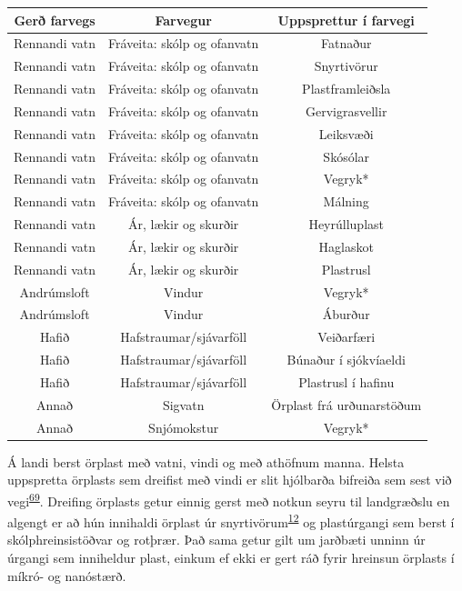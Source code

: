 \documentclass[icelandic,]{book}
\begin{document}
\begin{tabular}{ccc}
\toprule
Gerð farvegs & Farvegur & Uppsprettur í farvegi\\
\midrule
Rennandi vatn & Fráveita: skólp og ofanvatn & Fatnaður\\
Rennandi vatn & Fráveita: skólp og ofanvatn & Snyrtivörur\\
Rennandi vatn & Fráveita: skólp og ofanvatn & Plastframleiðsla\\
Rennandi vatn & Fráveita: skólp og ofanvatn & Gervigrasvellir\\
Rennandi vatn & Fráveita: skólp og ofanvatn & Leiksvæði\\
\addlinespace
Rennandi vatn & Fráveita: skólp og ofanvatn & Skósólar\\
Rennandi vatn & Fráveita: skólp og ofanvatn & Vegryk*\\
Rennandi vatn & Fráveita: skólp og ofanvatn & Málning\\
Rennandi vatn & Ár, lækir og skurðir & Heyrúlluplast\\
Rennandi vatn & Ár, lækir og skurðir & Haglaskot\\
\addlinespace
Rennandi vatn & Ár, lækir og skurðir & Plastrusl\\
Andrúmsloft & Vindur & Vegryk*\\
Andrúmsloft & Vindur & Áburður\\
Hafið & Hafstraumar/sjávarföll & Veiðarfæri\\
Hafið & Hafstraumar/sjávarföll & Búnaður í sjókvíaeldi\\
\addlinespace
Hafið & Hafstraumar/sjávarföll & Plastrusl í hafinu\\
Annað & Sigvatn & Örplast frá urðunarstöðum\\
Annað & Snjómokstur & Vegryk*\\
\bottomrule
\end{tabular}

Á landi berst örplast með vatni, vindi og með athöfnum manna. Helsta uppspretta örplasts sem dreifist með vindi er slit hjólbarða bifreiða sem sest við vegi\textsuperscript{\protect\hyperlink{ref-Cadle1978}{69}}. Dreifing örplasts getur einnig gerst með notkun seyru til landgræðslu en algengt er að hún innihaldi örplast úr snyrtivörum\textsuperscript{\protect\hyperlink{ref-zitko1991another}{12}} og plastúrgangi sem berst í skólphreinsistöðvar og rotþrær. Það sama getur gilt um jarðbæti unninn úr úrgangi sem inniheldur plast, einkum ef ekki er gert ráð fyrir hreinsun örplasts í míkró- og nanóstærð.
\end{document}
